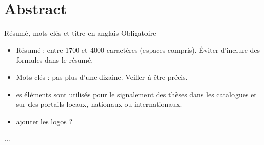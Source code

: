 \chapter*{Abstract}

Résumé, mots-clés et titre en anglais
Obligatoire
\begin{itemize}
    \item Résumé : entre 1700 et 4000 caractères (espaces compris). Éviter d’inclure des formules dans le résumé.
    \item Mots-clés : pas plus d'une dizaine. Veiller à être précis.
    \item es éléments sont utilisés pour le signalement des thèses dans les catalogues et sur des portails locaux, nationaux ou internationaux.
    \item ajouter les logos ?
\end{itemize} ...

    

